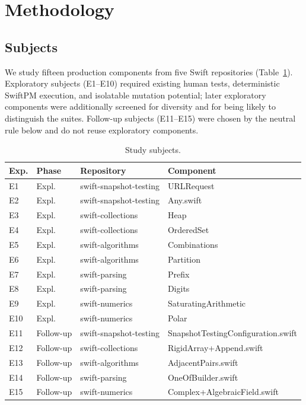 \documentclass[10pt,conference,a4paper]{IEEEtran}
\begin{document}
\section{Methodology}

\subsection{Subjects}
We study fifteen production components from five Swift repositories (Table~\ref{tab:subjects}). Exploratory subjects (E1--E10) required existing human tests, deterministic SwiftPM execution, and isolatable mutation potential; later exploratory components were additionally screened for diversity and for being likely to distinguish the suites. Follow-up subjects (E11--E15) were chosen by the neutral rule below and do not reuse exploratory components.

\begin{table}[t]
\centering
\caption{Study subjects.}
\label{tab:subjects}
\small
\setlength{\tabcolsep}{4pt}
\begin{tabular}{@{}llp{4.4cm}p{6.2cm}@{}}
\toprule
Exp. & Phase & Repository & Component \\
\midrule
E1 & Expl. & swift-snapshot-testing & URLRequest \\
E2 & Expl. & swift-snapshot-testing & Any.swift \\
E3 & Expl. & swift-collections & Heap \\
E4 & Expl. & swift-collections & OrderedSet \\
E5 & Expl. & swift-algorithms & Combinations \\
E6 & Expl. & swift-algorithms & Partition \\
E7 & Expl. & swift-parsing & Prefix \\
E8 & Expl. & swift-parsing & Digits \\
E9 & Expl. & swift-numerics & SaturatingArithmetic \\
E10 & Expl. & swift-numerics & Polar \\
E11 & Follow-up & swift-snapshot-testing & SnapshotTestingConfiguration.swift \\
E12 & Follow-up & swift-collections & RigidArray+Append.swift \\
E13 & Follow-up & swift-algorithms & AdjacentPairs.swift \\
E14 & Follow-up & swift-parsing & OneOfBuilder.swift \\
E15 & Follow-up & swift-numerics & Complex+AlgebraicField.swift \\
\bottomrule
\end{tabular}
\end{table}
\end{document}
